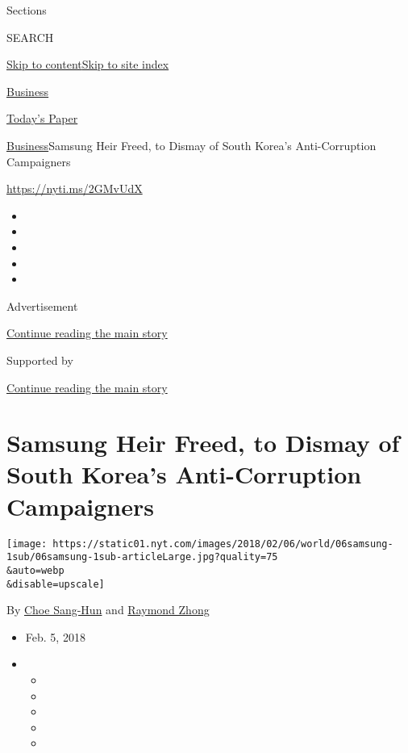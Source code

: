 Sections

SEARCH

\protect\hyperlink{site-content}{Skip to
content}\protect\hyperlink{site-index}{Skip to site index}

\href{https://www.nytimes.com/section/business}{Business}

\href{https://myaccount.nytimes.com/auth/login?response_type=cookie\&client_id=vi}{}

\href{https://www.nytimes.com/section/todayspaper}{Today's Paper}

\href{/section/business}{Business}\textbar{}Samsung Heir Freed, to
Dismay of South Korea's Anti-Corruption Campaigners

\url{https://nyti.ms/2GMvUdX}

\begin{itemize}
\item
\item
\item
\item
\item
\end{itemize}

Advertisement

\protect\hyperlink{after-top}{Continue reading the main story}

Supported by

\protect\hyperlink{after-sponsor}{Continue reading the main story}

\hypertarget{samsung-heir-freed-to-dismay-of-south-koreas-anti-corruption-campaigners}{%
\section{Samsung Heir Freed, to Dismay of South Korea's Anti-Corruption
Campaigners}\label{samsung-heir-freed-to-dismay-of-south-koreas-anti-corruption-campaigners}}

\texttt{[image: https://static01.nyt.com/images/2018/02/06/world/06samsung-1sub/06samsung-1sub-articleLarge.jpg?quality=75\\\&auto=webp\\\&disable=upscale]}

By \href{https://www.nytimes.com/by/choe-sang-hun}{Choe Sang-Hun} and
\href{https://www.nytimes.com/by/raymond-zhong}{Raymond Zhong}

\begin{itemize}
\item
  Feb. 5, 2018
\item
  \begin{itemize}
  \item
  \item
  \item
  \item
  \item
  \end{itemize}
\end{itemize}

